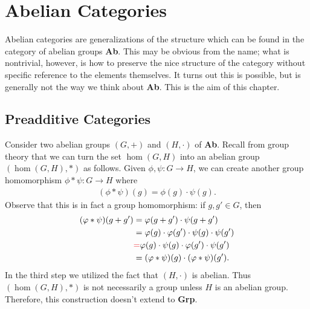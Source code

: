 \chapter{Abelian Categories}

Abelian categories are generalizations of the structure which can be 
found in the category of abelian groups \textbf{Ab}. This may be obvious from the name;
what is nontrivial, however, is how to preserve the nice structure of the category
without specific reference to the elements themselves. It turns out this is possible, 
but is generally not the way we think about \textbf{Ab}. This is the aim of this chapter. 

\section{Preadditive Categories}      

Consider two abelian groups $(G, +)$ and $(H, \cdot)$ of \textbf{Ab}. 
Recall from group theory that we can turn the
set $\hom(G, H)$ into an abelian group $(\hom(G, H), *)$ as follows.
Given $\phi, \psi: G \to H$, we can create another 
group homomorphism $\phi * \psi: G \to H$ where 
\begin{align*}
    (\phi * \psi)(g) = \phi(g) \cdot \psi(g).
\end{align*}
Observe that this is in fact a group homomorphism: if $g, g' \in G$, then 
\begin{align*}
    (\phi * \psi)(g + g') &= \phi(g + g') \cdot \psi(g + g')\\
    &=\phi(g) \cdot \phi(g') \cdot \psi(g) \cdot \psi(g')\\
    &\textcolor{Red}{=} \phi(g) \cdot \psi(g) \cdot \phi(g') \cdot \psi(g')\\
    &= (\phi * \psi)(g) \cdot (\phi *\psi)(g').
\end{align*}
In the third step we utilized the fact that $(H, \cdot)$ is abelian. 
Thus $(\hom(G, H), *)$ is not necessarily a group unless $H$ is an 
abelian group.
Therefore, this construction doesn't extend to \textbf{Grp}.

